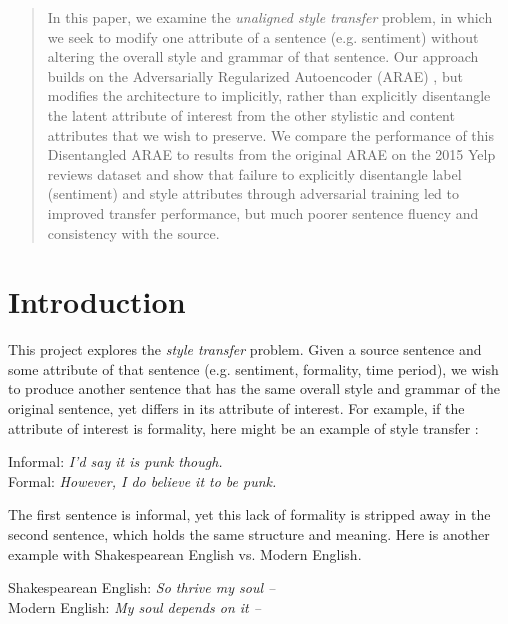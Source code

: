 \documentclass{article}
\begin{document}

\begin{abstract}
In this paper, we examine the \emph{unaligned style transfer} problem, in which we seek to modify one attribute of a sentence (e.g. sentiment) without altering the overall style and grammar of that sentence.  Our approach builds on the Adversarially Regularized Autoencoder (ARAE) \cite{arae}, but modifies the architecture to implicitly, rather than explicitly disentangle the latent attribute of interest from the other stylistic and content attributes that we wish to preserve. We compare the performance of this Disentangled ARAE to results from the original ARAE on the 2015 Yelp reviews dataset and show that failure to explicitly disentangle label (sentiment) and style attributes through adversarial training led to improved transfer performance, but much poorer sentence fluency and consistency with the source.
\end{abstract}

\section{Introduction}
\label{sec:introduction}

This project explores the \emph{style transfer} problem.  Given a source sentence and some attribute of that sentence (e.g. sentiment, formality, time period), we wish to produce another sentence that has the same overall style and grammar of the original sentence, yet differs in its attribute of interest.  For example, if the attribute of interest is formality, here might be an example of style transfer \cite{rao}:

\begin{center}
Informal: \emph{I'd say it is punk though.} \\
Formal: \emph{However, I do believe it to be punk.}
\end{center}

The first sentence is informal, yet this lack of formality is stripped away in the second sentence, which holds the same structure and meaning.  Here is another example with Shakespearean English vs. Modern English.

\begin{center}
Shakespearean English: \emph{So thrive my soul --} \\
Modern English: \emph{My soul depends on it --}
\end{center} 
\end{document}
